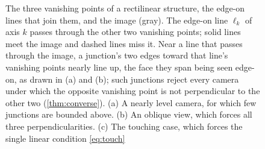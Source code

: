 \documentclass[pdflatex,sn-mathphys-num,iicol]{sn-jnl}
\newcommand{\vc}{\mathbf{c}}
\newcommand{\vv}{\mathbf{v}}
\theoremstyle{thmstyleone}
\theoremstyle{thmstylethree}
\theoremstyle{thmstyletwo}
\begin{document}
\begin{figure}[t]
\caption{The three vanishing points of a rectilinear structure, the edge-on lines that join them, and the image (gray). The edge-on line $\ell_k$ of axis $k$ passes through the other two vanishing points; solid lines meet the image and dashed lines miss it. Near a line that passes through the image, a junction's two edges toward that line's vanishing points nearly line up, the face they span being seen edge-on, as drawn in (a) and (b); such junctions reject every camera under which the opposite vanishing point is not perpendicular to the other two (\cref{thm:converse}). (a) A nearly level camera, for which few junctions are bounded above. (b) An oblique view, which forces all three perpendicularities. (c) The touching case, which forces the single linear condition \eqref{eq:touch}}
\label{fig:vlines}
\end{figure}
\end{document}
